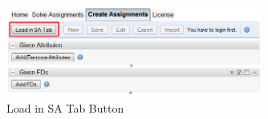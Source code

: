 \begin{figure}[h]
	\begin{center}
		\includegraphics[width=0.75\textwidth]{./img/load-in-sa.png}
		\caption{Load in SA Tab Button}
		\label{fig:load-in-sa}
	\end{center}
\end{figure}
